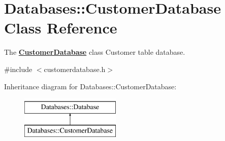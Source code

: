 \hypertarget{classDatabases_1_1CustomerDatabase}{\section{Databases\-:\-:Customer\-Database Class Reference}
\label{classDatabases_1_1CustomerDatabase}
}


The {\bfseries \hyperlink{classDatabases_1_1CustomerDatabase}{Customer\-Database}} class Customer table database.  




{\ttfamily \#include $<$customerdatabase.\-h$>$}

Inheritance diagram for Databases\-:\-:Customer\-Database\-:\begin{figure}[H]
\begin{center}
\leavevmode
\includegraphics[height=2.000000cm]{d8/d7e/classDatabases_1_1CustomerDatabase}
\end{center}
\end{figure}
